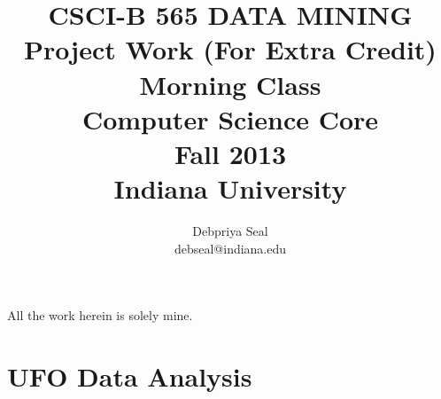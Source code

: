 \documentclass{article}
\begin{document}
\title{ CSCI-B 565 DATA MINING \\
Project Work (For Extra Credit) \\
Morning Class\\
Computer Science Core\\Fall 2013\\Indiana University}
\author{ Debpriya Seal\\ debseal@indiana.edu}
\maketitle
All the work herein is solely mine. \\

\section*{UFO Data Analysis}
\end{document}
